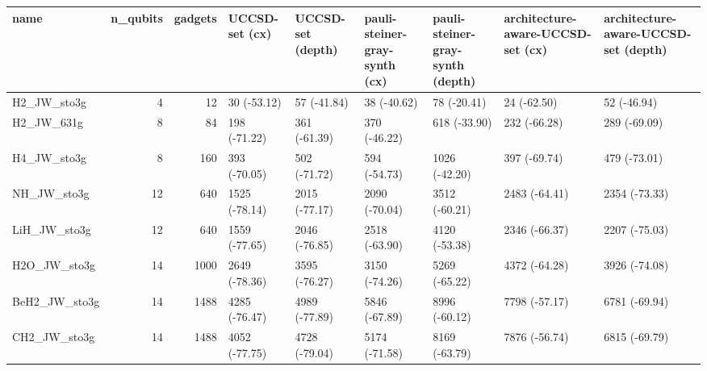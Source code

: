 \begin{tabular}{lrrllllll}
\toprule
name & n\_qubits & gadgets & UCCSD-set (cx) & UCCSD-set (depth) & pauli-steiner-gray-synth (cx) & pauli-steiner-gray-synth (depth) & architecture-aware-UCCSD-set (cx) & architecture-aware-UCCSD-set (depth) \\
\midrule
H2\_JW\_sto3g & 4 & 12 & 30 (-53.12) & 57 (-41.84) & 38 (-40.62) & 78 (-20.41) & 24 (-62.50) & 52 (-46.94) \\
H2\_JW\_631g & 8 & 84 & 198 (-71.22) & 361 (-61.39) & 370 (-46.22) & 618 (-33.90) & 232 (-66.28) & 289 (-69.09) \\
H4\_JW\_sto3g & 8 & 160 & 393 (-70.05) & 502 (-71.72) & 594 (-54.73) & 1026 (-42.20) & 397 (-69.74) & 479 (-73.01) \\
NH\_JW\_sto3g & 12 & 640 & 1525 (-78.14) & 2015 (-77.17) & 2090 (-70.04) & 3512 (-60.21) & 2483 (-64.41) & 2354 (-73.33) \\
LiH\_JW\_sto3g & 12 & 640 & 1559 (-77.65) & 2046 (-76.85) & 2518 (-63.90) & 4120 (-53.38) & 2346 (-66.37) & 2207 (-75.03) \\
H2O\_JW\_sto3g & 14 & 1000 & 2649 (-78.36) & 3595 (-76.27) & 3150 (-74.26) & 5269 (-65.22) & 4372 (-64.28) & 3926 (-74.08) \\
BeH2\_JW\_sto3g & 14 & 1488 & 4285 (-76.47) & 4989 (-77.89) & 5846 (-67.89) & 8996 (-60.12) & 7798 (-57.17) & 6781 (-69.94) \\
CH2\_JW\_sto3g & 14 & 1488 & 4052 (-77.75) & 4728 (-79.04) & 5174 (-71.58) & 8169 (-63.79) & 7876 (-56.74) & 6815 (-69.79) \\
\bottomrule
\end{tabular}
